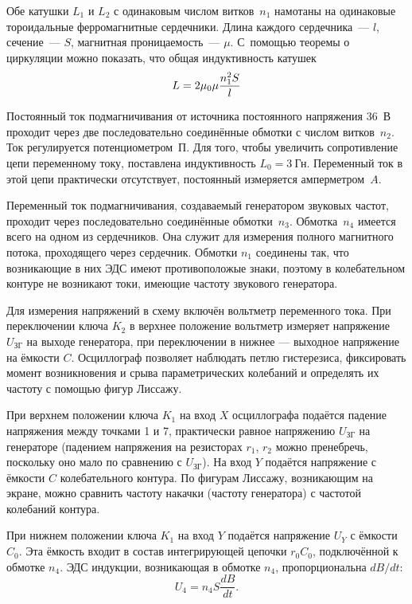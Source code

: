 Обе катушки $L_1$ и $L_2$ с одинаковым числом витков~$n_1$ намотаны на
одинаковые тороидальные ферромагнитные сердечники. Длина каждого сердечника~---
$l$, сечение~--- $S$, магнитная проницаемость~--- $\mu$. 
С~помощью теоремы о циркуляции можно показать, что общая индуктивность катушек
\begin{equation}
	\eqmark{4.6.5}
	L = 2\mu_0\mu\frac{n^2_1S}{l}
\end{equation}

Постоянный ток подмагничивания от источника постоянного напряжения 36~В проходит
через две последовательно соединённые обмотки с числом витков~$n_2$. Ток
регулируется потенциометром~$\text{П}$. Для того, чтобы увеличить сопротивление
цепи переменному току, поставлена индуктивность $L_0 = 3~$Гн. Переменный ток в
этой цепи практически отсутствует, постоянный измеряется амперметром~$A$.

Переменный ток подмагничивания, создаваемый генератором звуковых частот,
проходит через последовательно соединённые обмотки~$n_3$. Обмотка~$n_4$ имеется
всего на одном из сердечников. Она служит для измерения полного магнитного
потока, проходящего через сердечник. Обмотки $n_1$ соединены так, что
возникающие в них ЭДС имеют противоположые знаки, поэтому в колебательном
контуре не возникают токи, имеющие частоту звукового генератора.

Для измерения напряжений в схему включён вольтметр переменного тока. При
переключении ключа $K_2$ в верхнее положение вольтметр измеряет напряжение
$U_\text{ЗГ}$ на выходе генератора, при переключении в нижнее --- выходное
напряжение на ёмкости $C$. Осциллограф позволяет наблюдать петлю гистерезиса,
фиксировать момент возникновения и срыва параметрических колебаний и определять
их частоту с помощью фигур Лиссажу.

При верхнем положении ключа $K_1$ на вход $X$ осциллографа подаётся падение
напряжения между точками 1 и 7, практически равное напряжению $U_{\text{ЗГ}}$ на
генераторе (падением напряжения на резисторах $r_1$, $r_2$ можно пренебречь,
поскольку оно мало по сравнению с $U_{\text{ЗГ}}$). На вход $Y$ подаётся
напряжение с ёмкости $C$ колебательного контура. По фигурам Лиссажу, возникающим
на экране, можно сравнить частоту накачки (частоту генератора) с частотой
колебаний контура.

При нижнем положении ключа $K_1$ на вход $Y$ подаётся напряжение $U_Y$ с ёмкости
$C_0$. Эта ёмкость входит в состав интегрирующей цепочки $r_0C_0$, подключённой
к обмотке $n_4$. ЭДС индукции, возникающая в обмотке $n_4$, пропорциональна
$dB/dt$:
\begin{equation*}
	U_4 = n_4S\frac{dB}{dt}.
\end{equation*}

